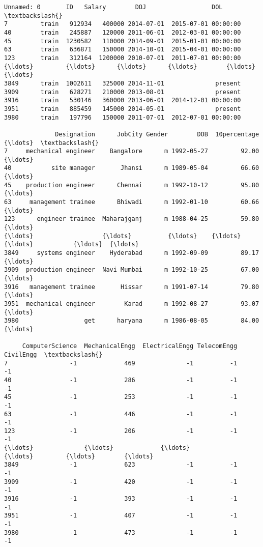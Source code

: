 \documentclass[11pt]{article}
\makeatletter
\newcommand{\boxspacing}{\kern\kvtcb@left@rule\kern\kvtcb@boxsep}
\newcommand{\prompt}[4]{
        \ttfamily\llap{{\color{#2}[#3]:\hspace{3pt}#4}}\vspace{-\baselineskip}
    }
\makeatother
\begin{document}
            \begin{tcolorbox}[breakable, size=fbox, boxrule=.5pt, pad at break*=1mm, opacityfill=0]
\prompt{Out}{outcolor}{43}{\boxspacing}
\begin{Verbatim}[commandchars=\\\{\}]
     Unnamed: 0       ID   Salary        DOJ                  DOL  \textbackslash{}
7         train   912934   400000 2014-07-01  2015-07-01 00:00:00
40        train   245887   120000 2011-06-01  2012-03-01 00:00:00
45        train  1230582   110000 2014-09-01  2015-01-01 00:00:00
63        train   636871   150000 2014-10-01  2015-04-01 00:00:00
123       train   312164  1200000 2010-07-01  2011-07-01 00:00:00
{\ldots}         {\ldots}      {\ldots}      {\ldots}        {\ldots}                  {\ldots}
3849      train  1002611   325000 2014-11-01              present
3909      train   628271   210000 2013-08-01              present
3916      train   530146   360000 2013-06-01  2014-12-01 00:00:00
3951      train   885459   145000 2014-05-01              present
3980      train   197796   150000 2011-07-01  2012-07-01 00:00:00

              Designation      JobCity Gender        DOB  10percentage  {\ldots}  \textbackslash{}
7     mechanical engineer    Bangalore      m 1992-05-27         92.00  {\ldots}
40           site manager       Jhansi      m 1989-05-04         66.60  {\ldots}
45    production engineer      Chennai      m 1992-10-12         95.80  {\ldots}
63     management trainee      Bhiwadi      m 1992-01-10         60.66  {\ldots}
123      engineer trainee  Maharajganj      m 1988-04-25         59.80  {\ldots}
{\ldots}                   {\ldots}          {\ldots}    {\ldots}        {\ldots}           {\ldots}  {\ldots}
3849     systems engineer    Hyderabad      m 1992-09-09         89.17  {\ldots}
3909  production engineer  Navi Mumbai      m 1992-10-25         67.00  {\ldots}
3916   management trainee       Hissar      m 1991-07-14         79.80  {\ldots}
3951  mechanical engineer        Karad      m 1992-08-27         93.07  {\ldots}
3980                  get      haryana      m 1986-08-05         84.00  {\ldots}

     ComputerScience  MechanicalEngg  ElectricalEngg TelecomEngg  CivilEngg  \textbackslash{}
7                 -1             469              -1          -1         -1
40                -1             286              -1          -1         -1
45                -1             253              -1          -1         -1
63                -1             446              -1          -1         -1
123               -1             206              -1          -1         -1
{\ldots}              {\ldots}             {\ldots}             {\ldots}         {\ldots}        {\ldots}
3849              -1             623              -1          -1         -1
3909              -1             420              -1          -1         -1
3916              -1             393              -1          -1         -1
3951              -1             407              -1          -1         -1
3980              -1             473              -1          -1         -1


\end{Verbatim}
\end{tcolorbox}
\end{document}

